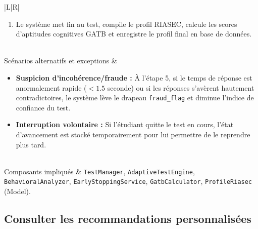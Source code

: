\begin{tabularx}{\linewidth}{|L|R|}
\begin{enumerate}[nosep,leftmargin=*]
  \item Le système met fin au test, compile le profil RIASEC, calcule les scores d'aptitudes cognitives GATB et enregistre le profil final en base de données.
\end{enumerate} \\
\hline
{}Scénarios alternatifs et exceptions &
\begin{itemize}[nosep,leftmargin=*]
  \item \textbf{Suspicion d'incohérence/fraude :} À l'étape 5, si le temps de réponse est anormalement rapide ($< 1.5$ seconde) ou si les réponses s'avèrent hautement contradictoires, le système lève le drapeau \texttt{fraud\_flag} et diminue l'indice de confiance du test.
  \item \textbf{Interruption volontaire :} Si l'étudiant quitte le test en cours, l'état d'avancement est stocké temporairement pour lui permettre de le reprendre plus tard.
\end{itemize} \\
\hline
Composants impliqués & \texttt{TestManager}, \texttt{AdaptiveTestEngine}, \texttt{BehavioralAnalyzer}, \texttt{EarlyStoppingService}, \texttt{GatbCalculator}, \texttt{ProfileRiasec} (Model). \\
\hline
\end{tabularx}

\vspace{1.5em}

\subsection{Consulter les recommandations personnalisées}

